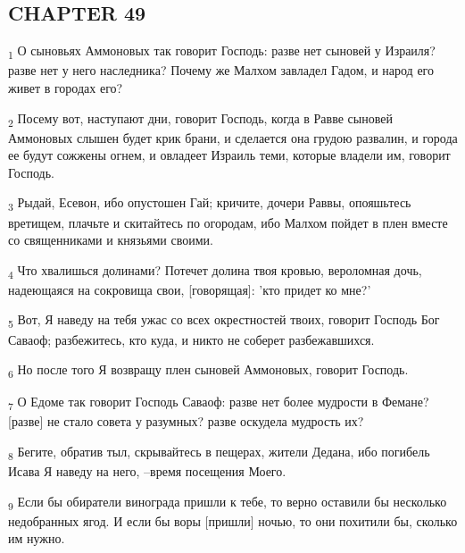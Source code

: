 \subsection{CHAPTER 49}
\begin{tcolorbox}
\textsubscript{1} О сыновьях Аммоновых так говорит Господь: разве нет сыновей у Израиля? разве нет у него наследника? Почему же Малхом завладел Гадом, и народ его живет в городах его?
\end{tcolorbox}
\begin{tcolorbox}
\textsubscript{2} Посему вот, наступают дни, говорит Господь, когда в Равве сыновей Аммоновых слышен будет крик брани, и сделается она грудою развалин, и города ее будут сожжены огнем, и овладеет Израиль теми, которые владели им, говорит Господь.
\end{tcolorbox}
\begin{tcolorbox}
\textsubscript{3} Рыдай, Есевон, ибо опустошен Гай; кричите, дочери Раввы, опояшьтесь вретищем, плачьте и скитайтесь по огородам, ибо Малхом пойдет в плен вместе со священниками и князьями своими.
\end{tcolorbox}
\begin{tcolorbox}
\textsubscript{4} Что хвалишься долинами? Потечет долина твоя кровью, вероломная дочь, надеющаяся на сокровища свои, [говорящая]: 'кто придет ко мне?'
\end{tcolorbox}
\begin{tcolorbox}
\textsubscript{5} Вот, Я наведу на тебя ужас со всех окрестностей твоих, говорит Господь Бог Саваоф; разбежитесь, кто куда, и никто не соберет разбежавшихся.
\end{tcolorbox}
\begin{tcolorbox}
\textsubscript{6} Но после того Я возвращу плен сыновей Аммоновых, говорит Господь.
\end{tcolorbox}
\begin{tcolorbox}
\textsubscript{7} О Едоме так говорит Господь Саваоф: разве нет более мудрости в Фемане? [разве] не стало совета у разумных? разве оскудела мудрость их?
\end{tcolorbox}
\begin{tcolorbox}
\textsubscript{8} Бегите, обратив тыл, скрывайтесь в пещерах, жители Дедана, ибо погибель Исава Я наведу на него, --время посещения Моего.
\end{tcolorbox}
\begin{tcolorbox}
\textsubscript{9} Если бы обиратели винограда пришли к тебе, то верно оставили бы несколько недобранных ягод. И если бы воры [пришли] ночью, то они похитили бы, сколько им нужно.
\end{tcolorbox}
